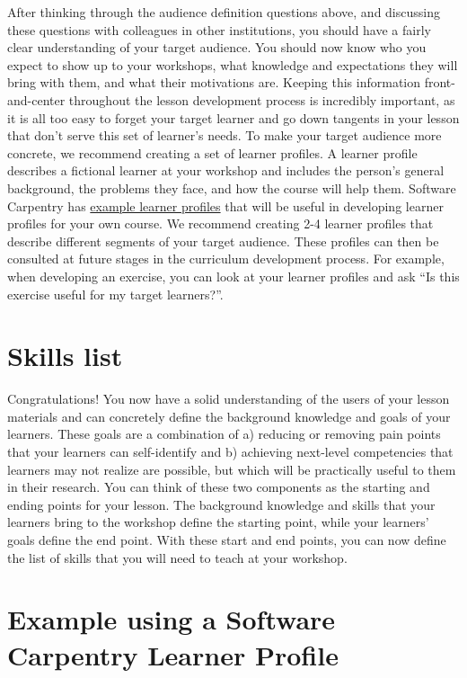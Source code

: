\documentclass[]{book}
\begin{document}
After thinking through the audience definition questions above, and discussing these questions with colleagues
in other institutions, you should have a fairly clear understanding of your target audience. You should now
know who you expect to show up to your workshops, what knowledge and expectations they will bring with them,
and what their motivations are. Keeping this information front-and-center throughout the lesson development
process is incredibly important, as it is all too easy to forget your target learner and go down tangents in
your lesson that don't serve this set of learner's needs. To make your target audience more concrete, we
recommend creating a set of learner profiles. A learner profile describes a fictional learner at your workshop
and includes the person's general background, the problems they face, and how the course will help them.
Software Carpentry has \href{https://carpentries.org/audience/}{example learner profiles} that will be useful
in developing learner profiles for your own course. We recommend creating 2-4 learner profiles that describe
different segments of your target audience. These profiles can then be consulted at future stages in the
curriculum development process. For example, when developing an exercise, you can look at your learner
profiles and ask ``Is this exercise useful for my target learners?''.

\hypertarget{skills-list}{%
\section{Skills list}\label{skills-list}}

Congratulations! You now have a solid understanding of the users of your lesson materials and can concretely
define the background knowledge and goals of your learners. These goals are a combination of a) reducing or
removing pain points that your learners can self-identify and b) achieving next-level competencies that
learners may not realize are possible, but which will be practically useful to them in their research.
You can think of these two components as the
starting and ending points for your lesson. The background knowledge and skills that your learners bring
to the workshop define the starting point, while your learners' goals define the end point. With these
start and end points, you can now define the list of skills that you will need to teach at your workshop.

\hypertarget{example-using-a-software-carpentry-learner-profile}{%
\section{Example using a Software Carpentry Learner Profile}\label{example-using-a-software-carpentry-learner-profile}}
\end{document}
